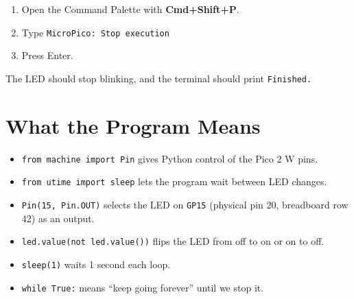 \documentclass[11pt,letterpaper]{article}
\begin{document}
\begin{enumerate}
    \item Open the Command Palette with \textbf{Cmd+Shift+P}.
    \item Type \texttt{MicroPico: Stop execution}
    \item Press Enter.
\end{enumerate}

The LED should stop blinking, and the terminal should print \texttt{Finished.}

\section*{What the Program Means}
\begin{itemize}
    \item \texttt{from machine import Pin} gives Python control of the Pico 2 W pins.
    \item \texttt{from utime import sleep} lets the program wait between LED changes.
    \item \texttt{Pin(15, Pin.OUT)} selects the LED on \texttt{GP15} (physical pin 20, breadboard row 42) as an output.
    \item \texttt{led.value(not led.value())} flips the LED from off to on or on to off.
    \item \texttt{sleep(1)} waits 1 second each loop.
    \item \texttt{while True:} means ``keep going forever'' until we stop it.
\end{itemize}
\end{document}
